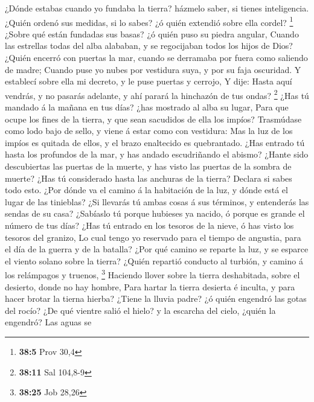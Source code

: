 ¿Dónde estabas cuando yo fundaba la tierra? házmelo
saber, si tienes inteligencia.  ¿Quién ordenó sus medidas,
si lo sabes? ¿ó quién extendió sobre ella cordel? \footnote{\textbf{38:5}
  Prov 30,4}  ¿Sobre qué están fundadas sus basas? ¿ó
quién puso su piedra angular,  Cuando las estrellas todas
del alba alababan, y se regocijaban todos los hijos de Dios?
 ¿Quién encerró con puertas la mar, cuando se derramaba
por fuera como saliendo de madre;  Cuando puse yo nubes
por vestidura suya, y por su faja oscuridad.  Y establecí
sobre ella mi decreto, y le puse puertas y cerrojo,  Y
dije: Hasta aquí vendrás, y no pasarás adelante, y ahí parará la
hinchazón de tus ondas? \footnote{\textbf{38:11} Sal 104,8-9}
 ¿Has tú mandado á la mañana en tus días? ¿has mostrado
al alba su lugar,  Para que ocupe los fines de la tierra,
y que sean sacudidos de ella los impíos?  Trasmúdase como
lodo bajo de sello, y viene á estar como con vestidura: 
Mas la luz de los impíos es quitada de ellos, y el brazo enaltecido es
quebrantado.  ¿Has entrado tú hasta los profundos de la
mar, y has andado escudriñando el abismo?  ¿Hante sido
descubiertas las puertas de la muerte, y has visto las puertas de la
sombra de muerte?  ¿Has tú considerado hasta las anchuras
de la tierra? Declara si sabes todo esto.  ¿Por dónde va
el camino á la habitación de la luz, y dónde está el lugar de las
tinieblas?  ¿Si llevarás tú ambas cosas á sus términos, y
entenderás las sendas de su casa?  ¿Sabíaslo tú porque
hubieses ya nacido, ó porque es grande el número de tus días?
 ¿Has tú entrado en los tesoros de la nieve, ó has visto
los tesoros del granizo,  Lo cual tengo yo reservado para
el tiempo de angustia, para el día de la guerra y de la batalla?
 ¿Por qué camino se reparte la luz, y se esparce el
viento solano sobre la tierra?  ¿Quién repartió conducto
al turbión, y camino á los relámpagos y truenos, \footnote{\textbf{38:25}
  Job 28,26}  Haciendo llover sobre la tierra
deshabitada, sobre el desierto, donde no hay hombre, 
Para hartar la tierra desierta é inculta, y para hacer brotar la tierna
hierba?  ¿Tiene la lluvia padre? ¿ó quién engendró las
gotas del rocío?  ¿De qué vientre salió el hielo? y la
escarcha del cielo, ¿quién la engendró?  Las aguas se
